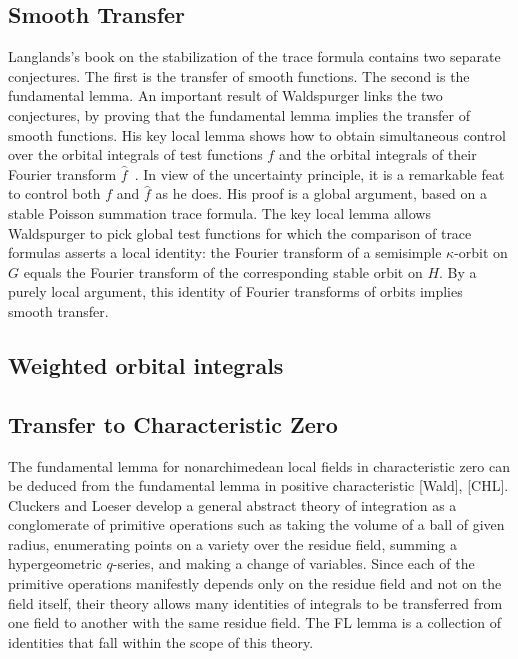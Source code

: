 \documentclass[brochure,english,12pt]{bourbaki}
\begin{document}
\subsection{Smooth Transfer}

Langlands's book on the stabilization of the trace formula contains
two separate conjectures.  The first is the transfer of smooth
functions.  The second is the fundamental lemma.  An important result
of Waldspurger links the two conjectures, by proving that the
fundamental lemma implies the transfer of smooth functions.  
His key local lemma shows how to obtain simultaneous control over the
orbital integrals of test functions $f$ and the orbital integrals of
their Fourier transform $\hat f$~\cite[Prop.~8.2]{W}.  
In view of the uncertainty principle, it is a remarkable feat to
control both $f$ and $\hat f$ as he does.
His proof is a global argument, based on a stable Poisson summation trace
formula.  The key local lemma allows Waldspurger to pick global test
functions for which the comparison of trace formulas asserts a
local identity: the Fourier transform of a semisimple
$\kappa$-orbit on $G$ equals the Fourier transform of the corresponding
stable orbit on $H$.  By a purely local argument, this identity of Fourier
transforms of orbits implies smooth transfer.

\subsection{Weighted orbital integrals}

\subsection{Transfer to Characteristic Zero}

The fundamental lemma for nonarchimedean local fields in
characteristic zero can be deduced from the fundamental lemma in
positive characteristic [Wald], [CHL].  Cluckers and Loeser develop a
general abstract theory of integration as a conglomerate of primitive
operations such as taking the volume of a ball of given radius,
enumerating points on a variety over the residue field, summing a
hypergeometric $q$-series, and making a change of variables.  Since each
of the primitive operations manifestly depends only on the residue
field and not on the field itself, their theory allows many identities
of integrals to be transferred from one field to another with the same
residue field.  The FL lemma is a collection of identities that fall
within the scope of this theory.
\end{document}

